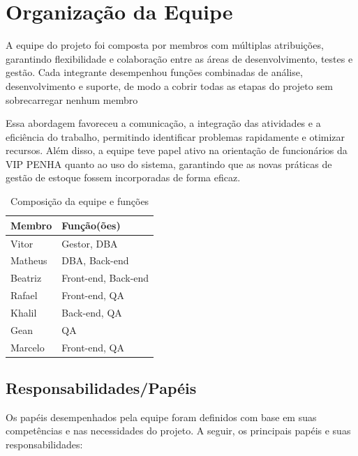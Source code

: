 \documentclass[
	12pt,				%
	openany,			%
	twoside,			%
	a4paper,			%
	english,			%
	brazil				%
	]{abntex2}
\begin{document}
\section{Organização da Equipe}

A equipe do projeto foi composta por membros com múltiplas atribuições, garantindo flexibilidade e colaboração entre as áreas de desenvolvimento, testes e gestão. Cada integrante desempenhou funções combinadas de análise, desenvolvimento e suporte, de modo a cobrir todas as etapas do projeto sem sobrecarregar nenhum membro

Essa abordagem favoreceu a comunicação, a integração das atividades e a eficiência do trabalho, permitindo identificar problemas rapidamente e otimizar recursos. Além disso, a equipe teve papel ativo na orientação de funcionários da VIP PENHA quanto ao uso do sistema, garantindo que as novas práticas de gestão de estoque fossem incorporadas de forma eficaz.

\begin{table}[htbp] 
\centering
\begin{tabular}{|l|l|}
\hline
\textbf{Membro} & \textbf{Função(ões)} \\ \hline
Vitor           & Gestor, DBA           \\ \hline
Matheus         & DBA, Back-end         \\ \hline
Beatriz         & Front-end, Back-end   \\ \hline
Rafael          & Front-end, QA         \\ \hline
Khalil              & Back-end, QA          \\ \hline
Gean            & QA                    \\ \hline
Marcelo         & Front-end, QA         \\ \hline
\end{tabular}
\caption{Composição da equipe e funções}
\end{table}


\subsection{Responsabilidades/Papéis}

Os papéis desempenhados pela equipe foram definidos com base em suas competências e nas necessidades do projeto. A seguir, os principais papéis e suas responsabilidades:
\end{document}
